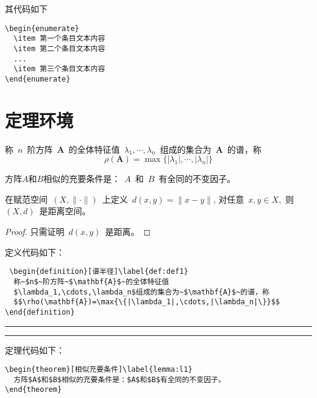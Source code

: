 其代码如下

\begin{verbatim}
\begin{enumerate}
  \item 第一个条目文本内容
  \item 第二个条目文本内容
  ...
  \item 第三个条目文本内容
\end{enumerate}
\end{verbatim}



\section{定理环境}

\begin{definition}[谱半径]\label{def:def1}
  称~$n$~阶方阵~$\mathbf{A}$~的全体特征值~$\lambda_1,\cdots,\lambda_n$~组成的集合为~$\mathbf{A}$~的谱，称
  $$\rho(\mathbf{A})=\max{\{|\lambda_1|,\cdots,|\lambda_n|\}}$$
\end{definition}
\begin{theorem}[相似充要条件]\label{lemma:l1}
  方阵$A$和$B$相似的充要条件是：~$A$~和~$B$~有全同的不变因子。
\end{theorem}
\begin{corollary}[推论1]\label{cor:cor1}
在赋范空间~$(X,\|\cdot\|)$~上定义~$d(x,y)=\|x-y\|$, 对任意~$x,y\in X$,~则~$(X,d)$~是距离空间。
\end{corollary}
\begin{proof}
  只需证明~$d(x,y)$~是距离。
\end{proof}
\newpage

定义代码如下：
\begin{verbatim}
 \begin{definition}[谱半径]\label{def:def1}
  称~$n$~阶方阵~$\mathbf{A}$~的全体特征值
  $\lambda_1,\cdots,\lambda_n$组成的集合为~$\mathbf{A}$~的谱，称
  $$\rho(\mathbf{A})=\max{\{|\lambda_1|,\cdots,|\lambda_n|\}}$$
\end{definition}
\end{verbatim}
\noindent\hrule

\vspace{0.1em}\noindent\hrule
\vspace{1em}
定理代码如下：
\begin{verbatim}
\begin{theorem}[相似充要条件]\label{lemma:l1}
  方阵$A$和$B$相似的充要条件是：$A$和$B$有全同的不变因子。
\end{theorem}
\end{verbatim}

